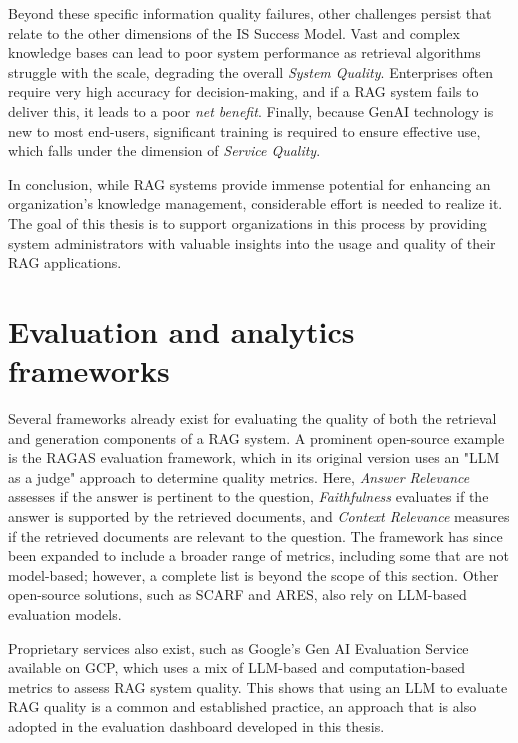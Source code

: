 \documentclass[
	english,
	ruledheaders=section,%
	class=report,%
	thesis={type=bachelor},%
	accentcolor=1b,%
	custommargins=true,%
	marginpar=false,%
	parskip=half-,%
	fontsize=11pt,%
	DIV=14,
]{tudapub}
\begin{document}
Beyond these specific information quality failures, other challenges persist that relate to the other dimensions of the IS Success Model. Vast and complex knowledge bases can lead to poor system performance as retrieval algorithms struggle with the scale, degrading the overall \textit{System Quality}. Enterprises often require very high accuracy for decision-making, and if a RAG system fails to deliver this, it leads to a poor \textit{net benefit}. Finally, because GenAI technology is new to most end-users, significant training is required to ensure effective use, which falls under the dimension of \textit{Service Quality}.

In conclusion, while RAG systems provide immense potential for enhancing an organization's knowledge management, considerable effort is needed to realize it. The goal of this thesis is to support organizations in this process by providing system administrators with valuable insights into the usage and quality of their RAG applications.
\section{Evaluation and analytics frameworks}
Several frameworks already exist for evaluating the quality of both the retrieval and generation components of a RAG system. A prominent open-source example is the RAGAS evaluation framework, which in its original version uses an "LLM as a judge" approach to determine quality metrics. Here, \textit{Answer Relevance} assesses if the answer is pertinent to the question, \textit{Faithfulness} evaluates if the answer is supported by the retrieved documents, and \textit{Context Relevance} measures if the retrieved documents are relevant to the question. The framework has since been expanded to include a broader range of metrics, including some that are not model-based; however, a complete list is beyond the scope of this section. Other open-source solutions, such as SCARF and ARES, also rely on LLM-based evaluation models.

Proprietary services also exist, such as Google's Gen AI Evaluation Service available on GCP, which uses a mix of LLM-based and computation-based metrics to assess RAG system quality. This shows that using an LLM to evaluate RAG quality is a common and established practice, an approach that is also adopted in the evaluation dashboard developed in this thesis.
\end{document}
